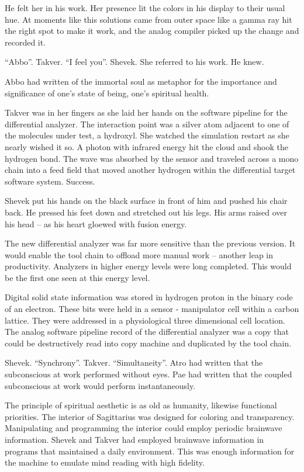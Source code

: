 He felt her in his work.  Her presence lit the colors in his display
to their usual hue.  At moments like this solutions came from outer
space like a gamma ray hit the right spot to make it work, and the
analog compiler picked up the change and recorded it.

``Abbo''.  Takver.  ``I feel you''.  Shevek.  She referred to his
work.  He knew.

Abbo had written of the immortal soul as metaphor for the importance
and significance of one's state of being, one's spiritual health.

Takver was in her fingers as she laid her hands on the software
pipeline for the differential analyzer.  The interaction point was a
silver atom adjacent to one of the molecules under test, a hydroxyl.
She watched the simulation restart as she nearly wished it so.  A
photon with infrared energy hit the cloud and shook the hydrogen bond.
The wave was absorbed by the sensor and traveled across a mono chain
into a feed field that moved another hydrogen within the differential
target software system.  Success.

Shevek put his hands on the black surface in front of him and pushed
his chair back.  He pressed his feet down and stretched out his legs.
His arms raised over his head -- as his heart gloewed with fusion
energy.

The new differential analyzer was far more sensitive than the previous
version.  It would enable the tool chain to offload more manual work
-- another leap in productivity.  Analyzers in higher energy levels
were long completed.  This would be the first one seen at this energy
level.

Digital solid state information was stored in hydrogen proton in the
binary code of an electron.  These bits were held in a sensor -
manipulator cell within a carbon lattice.  They were addressed in a
physiological three dimensional cell location.  The analog software
pipeline record of the differential analyzer was a copy that could be
destructively read into copy machine and duplicated by the tool chain.

Shevek.  ``Synchrony''.  Takver.  ``Simultaneity''.  Atro had written
that the subconscious at work performed without eyes.  Pae had written
that the coupled subconscious at work would perform instantaneously.

The principle of spiritual aesthetic is as old as humanity, likewise
functional priorities.  The interior of Sagittarius was designed for
coloring and transparency.  Manipulating and programming the interior
could employ periodic brainwave information.  Shevek and Takver had
employed brainwave information in programs that maintained a daily
environment.  This was enough information for the machine to emulate
mind reading with high fidelity.


